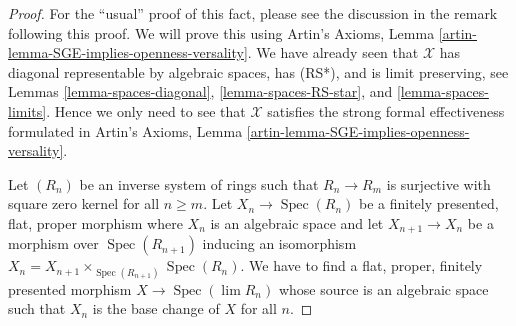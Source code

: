\documentclass{stacks-project}
\theoremstyle{plain}
\theoremstyle{definition}
\theoremstyle{remark}
\numberwithin{equation}{subsection}
\def\lim{\mathop{\mathrm{lim}}\nolimits}
\def\Spec{\mathop{\mathrm{Spec}}}
\begin{document}
\begin{proof}
For the ``usual'' proof of this fact, please see the discussion
in the remark following this proof. We will prove this using
Artin's Axioms, Lemma \ref{artin-lemma-SGE-implies-openness-versality}.
We have already seen that $\mathcal{X}$ has diagonal
representable by algebraic spaces, has (RS*), and is limit preserving,
see Lemmas \ref{lemma-spaces-diagonal},
\ref{lemma-spaces-RS-star}, and
\ref{lemma-spaces-limits}.
Hence we only need to see that $\mathcal{X}$ satisfies the strong
formal effectiveness formulated in
Artin's Axioms, Lemma \ref{artin-lemma-SGE-implies-openness-versality}.

\medskip\noindent
Let $(R_n)$ be an inverse system of rings such that
$R_n \to R_m$ is surjective with square zero kernel for
all $n \geq m$. Let $X_n \to \Spec(R_n)$ be a finitely presented,
flat, proper morphism where $X_n$ is an algebraic space and
let $X_{n + 1} \to X_n$ be a morphism over $\Spec(R_{n + 1})$
inducing an isomorphism $X_n = X_{n + 1} \times_{\Spec(R_{n + 1})} \Spec(R_n)$.
We have to find a flat, proper, finitely presented morphism
$X \to \Spec(\lim R_n)$ whose source is an algebraic space
such that $X_n$ is the base change of $X$ for all $n$.


\end{proof}
\end{document}
